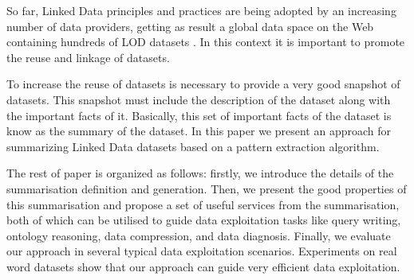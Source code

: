 So far, Linked Data principles and practices are being adopted by an increasing number of data providers, getting as result a global data space on the Web containing hundreds of LOD datasets \cite{Heath_Bizer_2011}. In this context it is important to promote the reuse and linkage of datasets.

To increase the reuse of datasets is necessary to provide a very good snapshot of datasets. This snapshot must include the description of the dataset along with the important facts of it. Basically, this set of important facts of the dataset is know as the summary of the dataset. In this paper we present an approach for summarizing Linked Data datasets based on a pattern extraction algorithm.

The rest of paper is organized as follows: firstly, we introduce the details of the summarisation definition and generation. Then, we present the good properties of this summarisation and propose a set of useful services from the summarisation, both of which can be utilised to guide data exploitation tasks like query writing, ontology reasoning, data compression, and data diagnosis. Finally, we evaluate our approach in several typical data exploitation scenarios. Experiments on real word datasets show that our approach can guide very efficient data exploitation.


